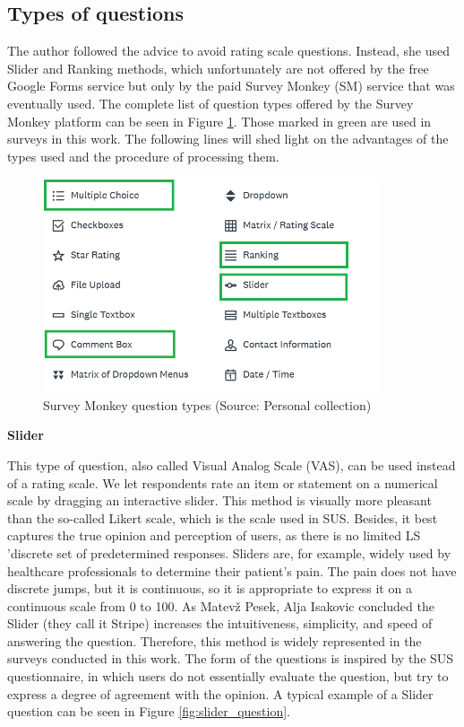 \documentclass[a4paper,10pt,twoside]{article}
\begin{document}
\subsection{Types of questions}

\noindent The author followed the advice to avoid rating scale
questions. Instead, she used Slider and Ranking methods, which
unfortunately are not offered by the free Google Forms service but
only by the paid Survey Monkey (SM) service that was eventually
used. The complete list of question types offered by the Survey Monkey
platform can be seen in Figure \ref{fig:survey_monkey_options}. Those
marked in green are used in surveys in this work. The following lines
will shed light on the advantages of the types used and the procedure
of processing them.

\vspace{0.3cm}
\begin{figure}[hbt!] 
\begin{center}
\includegraphics[width=10cm]{../pictures/survey_monkey_options.png} 
\caption[Survey Monkey answer types ]{Survey Monkey question types (Source: Personal collection)}
\label{fig:survey_monkey_options}
\end{center}
\end{figure}


\noindent \textbf {Slider}
\label{sec:slider}

\noindent This type of question, also called Visual Analog Scale
(VAS), can be used instead of a rating scale. We let respondents rate
an item or statement on a numerical scale by dragging an interactive
slider. This method is visually more pleasant than the so-called
Likert scale, which is the scale used in SUS. Besides, it best
captures the true opinion and perception of users, as there is no
limited LS 'discrete set of predetermined responses. Sliders are, for
example, widely used by healthcare professionals to determine their
patient's pain. The pain does not have discrete jumps, but it is
continuous, so it is appropriate to express it on a continuous scale
from 0 to 100. As Matevž Pesek, Alja Isakovic \cite{inproceedings}
concluded the Slider (they call it Stripe) increases the
intuitiveness, simplicity, and speed of answering the
question. Therefore, this method is widely represented in the surveys
conducted in this work. The form of the questions is inspired by the
SUS questionnaire, in which users do not essentially evaluate the
question, but try to express a degree of agreement with the opinion. A
typical example of a Slider question can be seen in Figure
\ref{fig:slider_question}.
\end{document}

